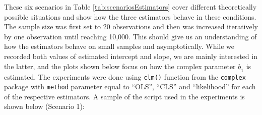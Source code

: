\documentclass[
]{book}
\begin{document}
These six scenarios in Table \ref{tab:scenariosEstimators} cover different theoretically possible situations and show how the three estimators behave in these conditions. The sample size was first set to 20 observations and then was increased iteratively by one observation until reaching 10,000. This should give us an understanding of how the estimators behave on small samples and asymptotically. While we recorded both values of estimated intercept and slope, we are mainly interested in the latter, and the plots shown below focus on how the complex parameter \(\underline{b}_1\) is estimated. The experiments were done using \texttt{clm()} function from the \texttt{complex} package with \texttt{method} parameter equal to ``OLS'', ``CLS'' and ``likelihood'' for each of the respective estimators. A sample of the script used in the experiments is shown below (Scenario 1):
\end{document}

